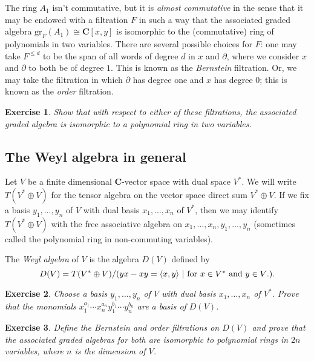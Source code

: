 \documentclass[12pt, reqno]{amsart}
\numberwithin{equation}{section}
\theoremstyle{definition}
\theoremstyle{plain}
\newtheorem{exercise}{Exercise}
\newcommand{\CC}{\mathbf{C}}
\newcommand{\la}{\langle}
\newcommand{\ra}{\rangle}
\begin{document}
The ring $A_1$ isn't commutative, but it is \emph{almost commutative} in the sense that it may be endowed with a filtration $F$ in such a way that the associated graded algebra $\mathrm{gr}_F(A_1) \cong \CC[x,y]$ is isomorphic to the (commutative) ring of polynomials in two variables. There are several possible choices for $F$: one may take $F^{\leq d}$ to be the span of all words of degree $d$ in $x$ and $\partial$, where we consider $x$ and $\partial$ to both be of degree $1$. This is known as the \emph{Bernstein} filtration. Or, we may take the filtration in which $\partial$ has degree one and $x$ has degree $0$; this is known as the \emph{order} filtration.

\begin{exercise} Show that with respect to either of these filtrations, the associated graded algebra is isomorphic to a polynomial ring in two variables.
\end{exercise}

\subsection{The Weyl algebra in general} Let $V$ be a finite dimensional $\CC$-vector space with dual space $V^*$. We will write $T(V^* \oplus V)$ for the tensor algebra on the vector space direct sum $V^* \oplus V$. If we fix a basis $y_1,\dots,y_n$ of $V$ with dual basis $x_1,\dots,x_n$ of $V^*$, then we may identify $T(V^* \oplus V)$ with the free associative algebra on $x_1,\dots,x_n,y_1,\dots,y_n$ (sometimes called the polynomial ring in non-commuting variables). 

The \emph{Weyl algebra} of $V$ is the algebra $D(V)$ defined by
$$D(V)=T(V^* \oplus V) / (yx-xy=\la x,y \ra \ \vert \ \hbox{for $x \in V^*$ and $y \in V$.}).$$

\begin{exercise}
Choose a basis $y_1,\dots,y_n$ of $V$ with dual basis $x_1,\dots,x_n$ of $V^*$. Prove that the monomials $x_1^{a_1}\cdots x_n^{a_n} y_1^{b_1} \cdots y_n^{b_n}$ are a basis of $D(V)$. 
\end{exercise}
\begin{exercise}
Define the Bernstein and order filtrations on $D(V)$ and prove that the associated graded algebras for both are isomorphic to polynomial rings in $2n$ variables, where $n$ is the dimension of $V$.	
\end{exercise}
\end{document}
